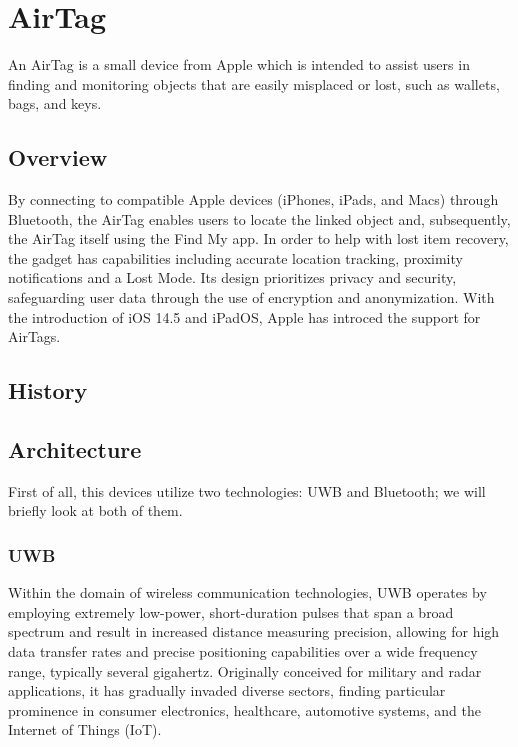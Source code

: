 \documentclass[english]{article}
\newcounter{subsubsubsection}[subsubsection]
\begin{document}
\section{AirTag}\label{sec:at}
An AirTag is a small device from Apple which is intended to assist users in finding and monitoring objects that are easily misplaced or lost, such as wallets, bags, and keys.
\subsection{Overview}
 By connecting to compatible Apple devices (iPhones, iPads, and Macs) through Bluetooth, the AirTag enables users to locate the linked object and, subsequently, the AirTag itself using the Find My app. In order to help with lost item recovery, the gadget has capabilities including accurate location tracking, proximity notifications and a Lost Mode. Its design prioritizes privacy and security, safeguarding user data through the use of encryption and anonymization. With the introduction of iOS 14.5 and iPadOS, Apple has introced the support for AirTags.
\subsection{History}
\subsection{Architecture}
First of all, this devices utilize two technologies: UWB and Bluetooth; we will briefly look at both of them.
\subsubsection{UWB}\label{sec:uwb}
Within the domain of wireless communication technologies, UWB operates by employing extremely low-power, short-duration pulses that span a broad spectrum and result in increased distance measuring precision, allowing for high data transfer rates and precise positioning capabilities over a wide frequency range, typically several gigahertz. Originally conceived for military and radar applications, it has gradually invaded diverse sectors, finding particular prominence in consumer electronics, healthcare, automotive systems, and the Internet of Things (IoT).
\end{document}

